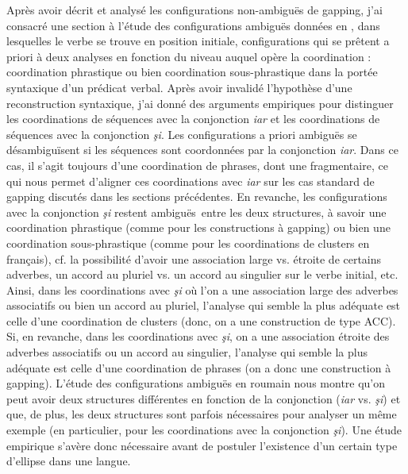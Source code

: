 Après avoir décrit et analysé les configurations non-ambiguës de gapping, j'ai consacré une section à l'étude des configurations ambiguës données en , dans lesquelles le verbe se trouve en position initiale, configurations qui se prêtent a priori à deux analyses en fonction du niveau auquel opère la coordination : coordination phrastique ou bien coordination sous-phrastique dans la portée syntaxique d'un prédicat verbal. Après avoir invalidé l'hypothèse d'une reconstruction syntaxique, j'ai donné des arguments empiriques pour distinguer les coordinations de séquences avec la conjonction \textit{iar} et les coordinations de séquences avec la conjonction \textit{şi}. Les configurations a priori ambiguës se désambiguïsent si les séquences sont coordonnées par la conjonction \textit{iar}. Dans ce cas, il s'agit toujours d'une coordination de phrases, dont une fragmentaire, ce qui nous permet d'aligner ces coordinations avec \textit{iar} sur les cas standard de gapping discutés dans les sections précédentes. En revanche, les configurations avec la conjonction \textit{şi} restent ambiguës~entre les deux structures, à savoir une coordination phrastique (comme pour les constructions à gapping) ou bien une coordination sous-phrastique (comme pour les coordinations de clusters en français), cf. la possibilité d'avoir une association large vs. étroite de certains adverbes, un accord au pluriel vs. un accord au singulier sur le verbe initial, etc. Ainsi, dans les coordinations avec \textit{şi} où l'on a une association large des adverbes associatifs ou bien un accord au pluriel, l'analyse qui semble la plus adéquate est celle d'une coordination de clusters (donc, on a une construction de type ACC). Si, en revanche, dans les coordinations avec \textit{şi}, on a une association étroite des adverbes associatifs ou un accord au singulier, l'analyse qui semble la plus adéquate est celle d'une coordination de phrases (on a donc une construction à gapping). L'étude des configurations ambiguës en roumain nous montre qu'on peut avoir deux structures différentes en fonction de la conjonction (\textit{iar} vs. \textit{şi}) et que, de plus, les deux structures sont parfois nécessaires pour analyser un même exemple (en particulier, pour les coordinations avec la conjonction \textit{şi}). Une étude empirique s'avère donc nécessaire avant de postuler l'existence d'un certain type d'ellipse dans une langue.

